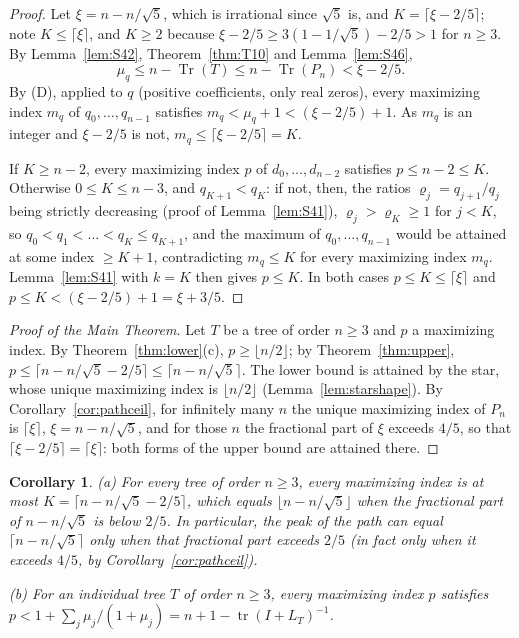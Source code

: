 \documentclass[11pt]{amsart}
\newtheorem{corollary}[theorem]{Corollary}
\theoremstyle{definition}
\theoremstyle{remark}
\newcommand{\tr}{\operatorname{tr}}
\newcommand{\Tr}{\operatorname{Tr}}
\begin{document}
\begin{proof}
Let $\xi=n-n/\sqrt5$, which is irrational since $\sqrt5$ is, and
$K=\lceil \xi-2/5\rceil$; note $K\le\lceil \xi\rceil$, and $K\ge2$ because
$\xi-2/5\ge3(1-1/\sqrt5)-2/5>1$ for $n\ge3$. By Lemma~\ref{lem:S42},
Theorem~\ref{thm:T10} and Lemma~\ref{lem:S46},
\[
\mu_q\le n-\Tr(T)\le n-\Tr(P_n)<\xi-2/5 .
\]
By (D), applied to $q$ (positive coefficients, only real zeros), every
maximizing index $m_q$ of $q_0,\dots,q_{n-1}$ satisfies
$m_q<\mu_q+1<(\xi-2/5)+1$. As $m_q$ is an integer and $\xi-2/5$ is not,
$m_q\le\lceil \xi-2/5\rceil=K$.

If $K\ge n-2$, every maximizing index $p$ of $d_0,\dots,d_{n-2}$ satisfies
$p\le n-2\le K$. Otherwise $0\le K\le n-3$, and $q_{K+1}<q_K$: if not, then,
the ratios $\varrho_j=q_{j+1}/q_j$ being strictly decreasing (proof of
Lemma~\ref{lem:S41}), $\varrho_j>\varrho_K\ge1$ for $j<K$, so
$q_0<q_1<\dots<q_K\le q_{K+1}$, and the maximum of $q_0,\dots,q_{n-1}$ would
be attained at some index $\ge K+1$, contradicting $m_q\le K$ for every
maximizing index $m_q$. Lemma~\ref{lem:S41} with $k=K$ then gives $p\le K$.
In both cases $p\le K\le\lceil \xi\rceil$ and $p\le K<(\xi-2/5)+1=\xi+3/5$.
\end{proof}

\begin{proof}[Proof of the Main Theorem]
Let $T$ be a tree of order $n\ge3$ and $p$ a maximizing index. By
Theorem~\ref{thm:lower}(c), $p\ge\lfloor n/2\rfloor$; by
Theorem~\ref{thm:upper}, $p\le\lceil n-n/\sqrt5-2/5\rceil\le\lceil n-n/\sqrt5\rceil$.
The lower bound is attained by the star, whose unique maximizing index is
$\lfloor n/2\rfloor$ (Lemma~\ref{lem:starshape}). By
Corollary~\ref{cor:pathceil}, for infinitely many $n$ the unique maximizing
index of $P_n$ is $\lceil\xi\rceil$, $\xi=n-n/\sqrt5$, and for those $n$ the
fractional part of $\xi$ exceeds $4/5$, so that
$\lceil\xi-2/5\rceil=\lceil\xi\rceil$: both forms of the upper bound are
attained there.
\end{proof}

\begin{corollary}\label{cor:sharper}
(a) For every tree of order $n\ge3$, every maximizing index is at most
$K=\lceil n-n/\sqrt5-2/5\rceil$, which equals $\lfloor n-n/\sqrt5\rfloor$
when the fractional part of $n-n/\sqrt5$ is below $2/5$. In particular, the
peak of the path can equal $\lceil n-n/\sqrt5\rceil$ only when that
fractional part exceeds $2/5$ (in fact only when it exceeds $4/5$, by
Corollary~\ref{cor:pathceil}).

(b) For an individual tree $T$ of order $n\ge3$, every maximizing index $p$
satisfies $p<1+\sum_j\mu_j/(1+\mu_j)=n+1-\tr(I+L_T)^{-1}$.
\end{corollary}
\end{document}
